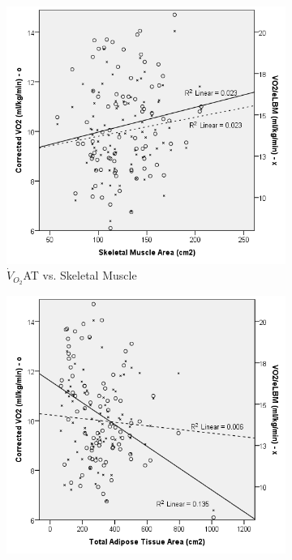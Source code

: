 \begin{figure}[htb]
	\centering
	\begin{subfigure}[b]{0.45\textwidth}
		\centering
		\includegraphics[width=\textwidth]{Figures/bc_scatter_VO2_skeletal_elbm}
		\caption{$\dot{V}_{O_2}$AT vs. 
Skeletal Muscle}
		\label{fig:bc_scatter_VO2_skeletal_elbm}
	\end{subfigure}
	\hfill
	\begin{subfigure}[b]{0.45\textwidth}
		\centering
		\includegraphics[width=\textwidth]{Figures/bc_scatter_VO2_TAT_elbm}

\end{subfigure}
\end{figure}
